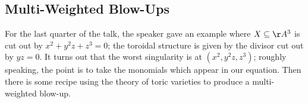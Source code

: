 \documentclass{article}
\begin{document}
\subsection{Multi-Weighted Blow-Ups}
For the last quarter of the talk, the speaker gave an example where $X\subseteq\AA^3$ is cut out by $x^2+y^2z+z^3=0$; the toroidal structure is given by the divisor cut out by $yz=0$. It turns out that the worst singularity is at $\left(x^2,y^2z,z^3\right)$; roughly speaking, the point is to take the monomials which appear in our equation. Then there is some recipe using the theory of toric varieties to produce a multi-weighted blow-up.
\end{document}
